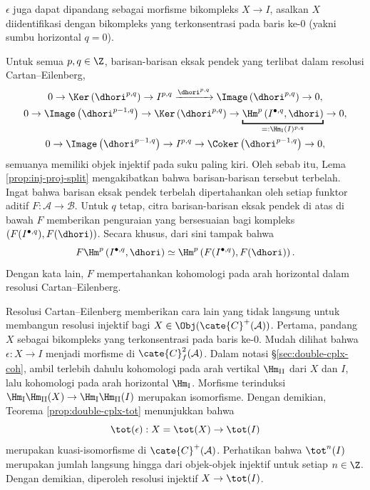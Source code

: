 $\epsilon$ juga dapat dipandang sebagai morfisme bikompleks $X \to I$, asalkan $X$ diidentifikasi dengan bikompleks yang terkonsentrasi pada baris ke-$0$ (yakni sumbu horizontal $q=0$).

\begin{catatan}\label{rem:CE-split}
	Untuk semua $p, q \in \Z$, barisan-barisan eksak pendek yang terlibat dalam resolusi Cartan--Eilenberg,
	\begin{gather*}
		0 \to \Ker\left( \dhori^{p,q} \right) \to I^{p,q} \xrightarrow{\dhori^{p,q}} \Image\left( \dhori^{p,q} \right) \to 0, \\
		0 \to \Image\left( \dhori^{p-1,q} \right) \to \Ker\left( \dhori^{p,q} \right) \to \underbracket{\Hm^p\left( I^{\bullet, q}, \dhori \right)}_{=: \Hm_{\mathrm{I}}(I)^{p,q}} \to 0, \\
		0 \to \Image\left( \dhori^{p-1,q} \right) \to I^{p, q} \to \Coker\left( \dhori^{p-1,q} \right) \to 0,
	\end{gather*}
	semuanya memiliki objek injektif pada suku paling kiri. Oleh sebab itu, Lema \ref{prop:inj-proj-split} mengakibatkan bahwa barisan-barisan tersebut terbelah. Ingat bahwa barisan eksak pendek terbelah dipertahankan oleh setiap funktor aditif $F: \mathcal{A} \to \mathcal{B}$. Untuk $q$ tetap, citra barisan-barisan eksak pendek di atas di bawah $F$ memberikan penguraian yang bersesuaian bagi kompleks $(F(I^{\bullet, q}), F(\dhori))$. Secara khusus, dari sini tampak bahwa
	\[ F\Hm^p\left( I^{\bullet, q}, \dhori \right) \simeq \Hm^p\left( F(I^{\bullet, q}), F(\dhori) \right). \]
	Dengan kata lain, $F$ mempertahankan kohomologi pada arah horizontal dalam resolusi Cartan--Eilenberg.
\end{catatan}

\begin{catatan}\label{rem:double-cplx-resolution}
	Resolusi Cartan--Eilenberg memberikan cara lain yang tidak langsung untuk membangun resolusi injektif bagi $X \in \Obj(\cate{C}^+(\mathcal{A}))$. Pertama, pandang $X$ sebagai bikompleks yang terkonsentrasi pada baris ke-$0$. Mudah dilihat bahwa $\epsilon: X \to I$ menjadi morfisme di $\cate{C}^2_f(\mathcal{A})$. Dalam notasi \S\ref{sec:double-cplx-coh}, ambil terlebih dahulu kohomologi pada arah vertikal $\Hm_{\mathrm{II}}$ dari $X$ dan $I$, lalu kohomologi pada arah horizontal $\Hm_{\mathrm{I}}$. Morfisme terinduksi $\Hm_{\mathrm{I}} \Hm_{\mathrm{II}} (X) \to \Hm_{\mathrm{I}} \Hm_{\mathrm{II}} (I)$ merupakan isomorfisme. Dengan demikian, Teorema \ref{prop:double-cplx-tot} menunjukkan bahwa
	\[ \tot(\epsilon): X = \tot(X) \to \tot(I) \]
	merupakan kuasi-isomorfisme di $\cate{C}^+(\mathcal{A})$. Perhatikan bahwa $\tot^n(I)$ merupakan jumlah langsung hingga dari objek-objek injektif untuk setiap $n \in \Z$. Dengan demikian, diperoleh resolusi injektif $X \to \tot(I)$.
\end{catatan}
	
